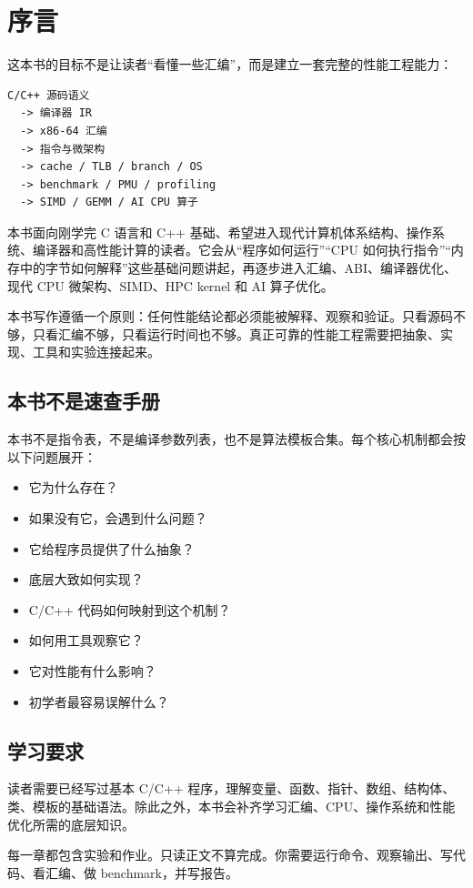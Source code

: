 \chapter*{序言}

这本书的目标不是让读者“看懂一些汇编”，而是建立一套完整的性能工程能力：

\begin{center}
\begin{minipage}{0.82\linewidth}
\begin{verbatim}
C/C++ 源码语义
  -> 编译器 IR
  -> x86-64 汇编
  -> 指令与微架构
  -> cache / TLB / branch / OS
  -> benchmark / PMU / profiling
  -> SIMD / GEMM / AI CPU 算子
\end{verbatim}
\end{minipage}
\end{center}

本书面向刚学完 C 语言和 C++ 基础、希望进入现代计算机体系结构、操作系统、编译器和高性能计算的读者。它会从“程序如何运行”“CPU 如何执行指令”“内存中的字节如何解释”这些基础问题讲起，再逐步进入汇编、ABI、编译器优化、现代 CPU 微架构、SIMD、HPC kernel 和 AI 算子优化。

本书写作遵循一个原则：任何性能结论都必须能被解释、观察和验证。只看源码不够，只看汇编不够，只看运行时间也不够。真正可靠的性能工程需要把抽象、实现、工具和实验连接起来。

\section*{本书不是速查手册}

本书不是指令表，不是编译参数列表，也不是算法模板合集。每个核心机制都会按以下问题展开：

\begin{itemize}
  \item 它为什么存在？
  \item 如果没有它，会遇到什么问题？
  \item 它给程序员提供了什么抽象？
  \item 底层大致如何实现？
  \item C/C++ 代码如何映射到这个机制？
  \item 如何用工具观察它？
  \item 它对性能有什么影响？
  \item 初学者最容易误解什么？
\end{itemize}

\section*{学习要求}

读者需要已经写过基本 C/C++ 程序，理解变量、函数、指针、数组、结构体、类、模板的基础语法。除此之外，本书会补齐学习汇编、CPU、操作系统和性能优化所需的底层知识。

每一章都包含实验和作业。只读正文不算完成。你需要运行命令、观察输出、写代码、看汇编、做 benchmark，并写报告。

